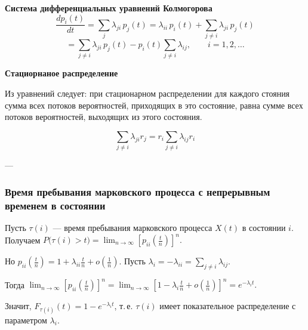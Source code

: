 \vspace{1em}

\textbf{Система дифференциальных уравнений Колмогорова}
\[
	\frac{dp_i(t)}{dt}
	= \sum_j \lambda_{ji}\,p_j(t)
	= \lambda_{ii}\,p_i(t)
	+ \sum_{j \ne i} \lambda_{ji}\,p_j(t)
\]
\[
	= \sum_{j \ne i} \lambda_{ji}\,p_j(t)
	- p_i(t)\sum_{j \ne i} \lambda_{ij},
	\qquad i = 1, 2, \ldots
\]

\textbf{Стациорнаное распределение}

Из уравнений следует: при стационарном распределении для каждого стояния сумма всех потоков вероятностей, приходящих в это состояние, равна сумме всех потоков вероятностей, выходящих из этого состояния.

\[
	\sum_{j \ne i} \lambda_{ji} r_j = r_i \sum_{j \ne i} \lambda_{ij} r_i
\]

---

\subsubsection*{Время пребывания марковского процесса с непрерывным временем в состоянии}

Пусть $\tau(i)$ — время пребывания марковского процесса $X(t)$ в состоянии $i$.
Получаем
$P\bigl(\tau(i) > t\bigr)= \lim_{n \to \infty} [p_{ii}(\frac{t}{n})]^n.$

Но $p_{ii}\!\left(\tfrac{t}{n}\right)= 1 + \lambda_{ii}\tfrac{t}{n} + o\!\left(\tfrac{1}{n}\right).$
Пусть $\lambda_i = -\lambda_{ii} = \sum_{j \ne i} \lambda_{ij}$.

Тогда
$\lim_{n \to \infty} [p_{ii}(\frac{t}{n})]^n
	= \lim_{n \to \infty}
	\left[1 - \lambda_i \tfrac{t}{n} + o\!\left(\tfrac{1}{n}\right)\right]^n
	= e^{-\lambda_i t}.$

Значит, $F_{\tau(i)}(t) = 1 - e^{-\lambda_i t}$,
т.\,е. $\tau(i)$ имеет показатель­ное распределение с параметром $\lambda_i$.

